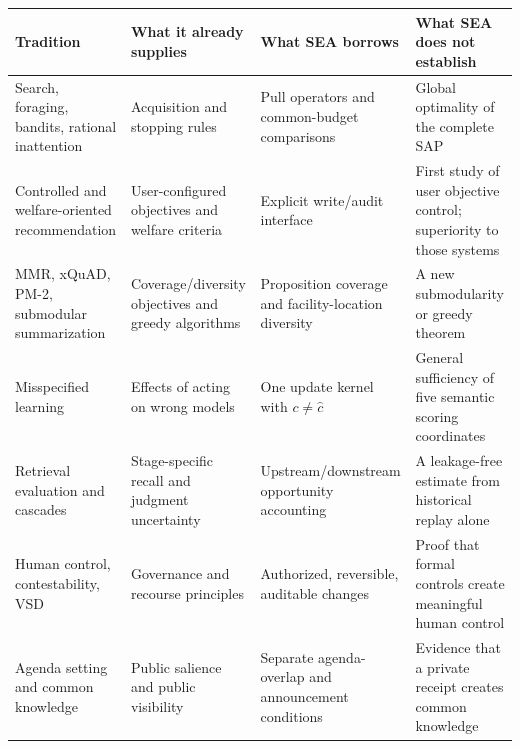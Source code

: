 \documentclass[
  11pt]{article}
\begin{document}
\begin{longtable}[]{@{}
  >{\raggedright\arraybackslash}p{}
  >{\raggedright\arraybackslash}p{}
  >{\raggedright\arraybackslash}p{}
  >{\raggedright\arraybackslash}p{}@{}}
\toprule\noalign{}
\begin{minipage}[b]{\linewidth}\raggedright
Tradition
\end{minipage} & \begin{minipage}[b]{\linewidth}\raggedright
What it already supplies
\end{minipage} & \begin{minipage}[b]{\linewidth}\raggedright
What SEA borrows
\end{minipage} & \begin{minipage}[b]{\linewidth}\raggedright
What SEA does not establish
\end{minipage} \\
\midrule\noalign{}
\endhead
\bottomrule\noalign{}
\endlastfoot
Search, foraging, bandits, rational inattention & Acquisition and
stopping rules & Pull operators and common-budget comparisons & Global
optimality of the complete SAP \\
Controlled and welfare-oriented recommendation & User-configured
objectives and welfare criteria & Explicit write/audit interface & First
study of user objective control; superiority to those systems \\
MMR, xQuAD, PM-2, submodular summarization & Coverage/diversity
objectives and greedy algorithms & Proposition coverage and
facility-location diversity & A new submodularity or greedy theorem \\
Misspecified learning & Effects of acting on wrong models & One update
kernel with \(c\ne\hat c\) & General sufficiency of five semantic
scoring coordinates \\
Retrieval evaluation and cascades & Stage-specific recall and judgment
uncertainty & Upstream/downstream opportunity accounting & A
leakage-free estimate from historical replay alone \\
Human control, contestability, VSD & Governance and recourse principles
& Authorized, reversible, auditable changes & Proof that formal controls
create meaningful human control \\
Agenda setting and common knowledge & Public salience and public
visibility & Separate agenda-overlap and announcement conditions &
Evidence that a private receipt creates common knowledge \\
\end{longtable}
\end{document}
